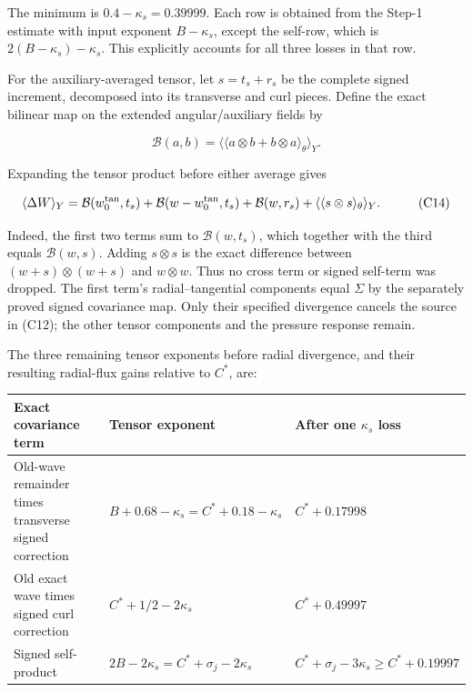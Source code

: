 \documentclass[10pt,a4paper]{article}
\newcounter{none}
\begin{document}
The minimum is \(0.4-\kappa_s=0.39999\). Each row is obtained from the Step-1 estimate with input exponent \(B-\kappa_s\), except the self-row, which is \(2(B-\kappa_s)-\kappa_s\). This explicitly accounts for all three losses in that row.

For the auxiliary-averaged tensor, let \(s=t_s+r_s\) be the complete signed increment, decomposed into its transverse and curl pieces. Define the exact bilinear map on the extended angular/auxiliary fields by

\[
\mathcal B(a,b)=\langle\langle a\otimes b+b\otimes a\rangle_\theta\rangle_Y.
\tag{C13}
\]

Expanding the tensor product before either average gives

\[
\begin{aligned}
\langle\Delta W\rangle_Y
={}&\mathcal B(w_0^{\rm tan},t_s)
+\mathcal B(w-w_0^{\rm tan},t_s)
+\mathcal B(w,r_s)
+\langle\langle s\otimes s\rangle_\theta\rangle_Y.
\end{aligned}
\tag{C14}
\]

Indeed, the first two terms sum to \(\mathcal B(w,t_s)\), which together with the third equals \(\mathcal B(w,s)\). Adding \(s\otimes s\) is the exact difference between \((w+s)\otimes(w+s)\) and \(w\otimes w\). Thus no cross term or signed self-term was dropped. The first term's radial--tangential components equal \(\Sigma\) by the separately proved signed covariance map. Only their specified divergence cancels the source in (C12); the other tensor components and the pressure response remain.

The three remaining tensor exponents before radial divergence, and their resulting radial-flux gains relative to \(C^*\), are:

{\def\LTcaptype{none} %
\begin{longtable}[]{@{}
  >{\raggedright\arraybackslash}p{}
  >{\raggedright\arraybackslash}p{}
  >{\raggedright\arraybackslash}p{}@{}}
\toprule\noalign{}
\begin{minipage}[b]{\linewidth}\raggedright
Exact covariance term
\end{minipage} & \begin{minipage}[b]{\linewidth}\raggedright
Tensor exponent
\end{minipage} & \begin{minipage}[b]{\linewidth}\raggedright
After one \(\kappa_s\) loss
\end{minipage} \\
\midrule\noalign{}
\endhead
\bottomrule\noalign{}
\endlastfoot
Old-wave remainder times transverse signed correction & \(B+0.68-\kappa_s=C^*+0.18-\kappa_s\) & \(C^*+0.17998\) \\
Old exact wave times signed curl correction & \(C^*+1/2-2\kappa_s\) & \(C^*+0.49997\) \\
Signed self-product & \(2B-2\kappa_s=C^*+\sigma_j-2\kappa_s\) & \(C^*+\sigma_j-3\kappa_s\ge C^*+0.19997\) \\
\end{longtable}
}
\end{document}
